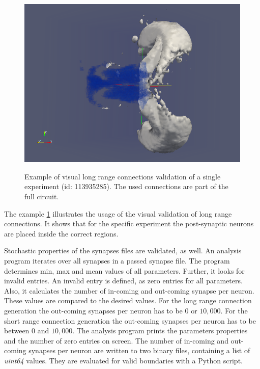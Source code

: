 \begin{figure}[ht!]
\begin{center}
{            \includegraphics[scale=0.15]{pictures/exp1_post_contour.png}
       }
    \end{center}
    	\caption{%
        Example of visual long range connections validation of a single experiment (id: 113935285).
        The used connections are part of the full circuit.
     }%
   \label{fig:longrangevalidation}
   \end{figure}
   
The example \ref{fig:longrangevalidation} illustrates the usage of the visual validation of long range connections.
It shows that for the specific experiment the post-synaptic neurons are placed inside the correct regions.

Stochastic properties of the synapses files are validated, as well.
An analysis program iterates over all synapses in a passed synapse file.
The program determines min, max and mean values of all parameters.
Further, it looks for invalid entries. An invalid entry is defined, as
zero entries for all parameters. Also, it calculates the number of in-coming
and out-coming synapse per neuron. These values are compared to the desired values.
For the long range connection generation the out-coming synapses per neuron has to be
$0$ or $10,000$. For the short range connection generation the out-coming synapses per neuron
has to be between $0$ and $10,000$. The analysis program prints the parameters properties 
and the number of zero entries on screen. The number of in-coming and out-coming 
synapses per neuron are written to two binary files, containing a list of \emph{uint64} values.
They are evaluated for valid boundaries with a Python script.




